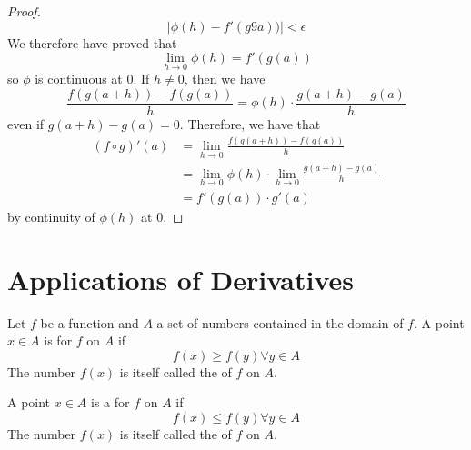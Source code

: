 \documentclass[12pt, a4paper, oneside, openright, titlepage]{book}
\begin{document}
\begin{proof}
\begin{equation*}
        |\phi(h) - f'(g9a))| < \epsilon
    \end{equation*}
    We therefore have proved that \begin{equation*}
        \lim\limits_{h\rightarrow 0}\phi(h) = f'(g(a))
    \end{equation*}
    so $\phi$ is continuous at $0$. If $h \neq 0$, then we have $$\frac{f(g(a+h)) - f(g(a))}{h} = \phi(h)\cdot \frac{g(a+h)-g(a)}{h}$$
    even if $g(a+h)-g(a) = 0$. Therefore, we have that \begin{align*}
        (f\circ g)'(a) &= \lim\limits_{h\rightarrow 0}\frac{f(g(a+h)) - f(g(a))}{h} \\
        &= \lim\limits_{h\rightarrow 0}\phi(h)\cdot \lim\limits_{h\rightarrow 0}\frac{g(a+h)-g(a)}{h} \\
        &= f'(g(a))\cdot g'(a) 
    \end{align*}
    by continuity of $\phi(h)$ at $0$.
\end{proof}



\section{Applications of Derivatives}

\begin{defn}[Extrema]
    Let $f$ be a function and $A$ a set of numbers contained in the domain of $f$. A point $x \in A$ is  for $f$ on $A$ if \begin{equation}
        f(x) \geq f(y) \forall y \in A
    \end{equation}
    The number $f(x)$ is itself called the  of $f$ on $A$.

    A point $x \in A$ is a  for $f$ on $A$ if \begin{equation}
        f(x) \leq f(y) \forall y \in A
    \end{equation}
    The number $f(x)$ is itself called the  of $f$ on $A$.
\end{defn}
\end{document}
